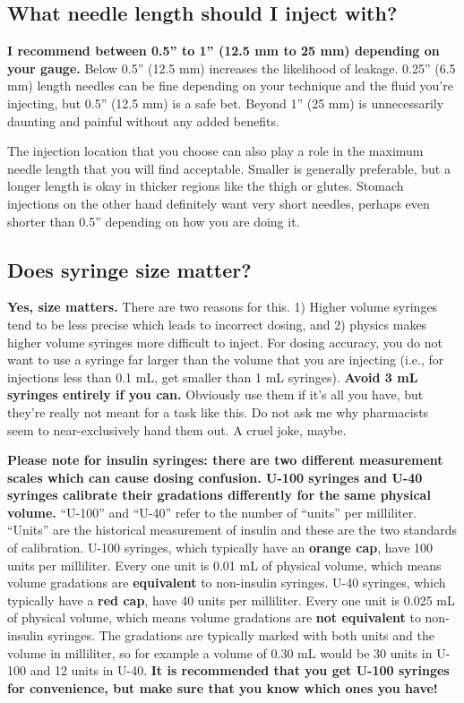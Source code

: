 \documentclass{article}
\begin{document}
\subsection{What needle length should I inject with?}\label{5-17}

\textbf{I recommend between 0.5” to 1” (12.5 mm to 25 mm) depending on your gauge.} Below 0.5” (12.5 mm) increases the likelihood of leakage. 0.25” (6.5 mm) length needles can be fine depending on your technique and the fluid you’re injecting, but 0.5” (12.5 mm) is a safe bet. Beyond 1” (25 mm) is unnecessarily daunting and painful without any added benefits.

The injection location that you choose can also play a role in the maximum needle length that you will find acceptable. Smaller is generally preferable, but a longer length is okay in thicker regions like the thigh or glutes. Stomach injections on the other hand definitely want very short needles, perhaps even shorter than 0.5” depending on how you are doing it. 

\subsection{Does syringe size matter?}\label{5-18}

\textbf{Yes, size matters.} There are two reasons for this. 1) Higher volume syringes tend to be less precise which leads to incorrect dosing, and 2) physics makes higher volume syringes more difficult to inject. For dosing accuracy, you do not want to use a syringe far larger than the volume that you are injecting (i.e., for injections less than 0.1 mL, get smaller than 1 mL syringes). \textbf{Avoid 3 mL syringes entirely if you can.} Obviously use them if it’s all you have, but they’re really not meant for a task like this. Do not ask me why pharmacists seem to near-exclusively hand them out. A cruel joke, maybe.

\textbf{Please note for insulin syringes: there are two different measurement scales which can cause dosing confusion. U-100 syringes and U-40 syringes calibrate their gradations differently for the same physical volume.} “U-100” and “U-40” refer to the number of “units” per milliliter. “Units” are the historical measurement of insulin and these are the two standards of calibration. U-100 syringes, which typically have an \textbf{orange cap}, have 100 units per milliliter. Every one unit is 0.01 mL of physical volume, which means volume gradations are \textbf{equivalent} to non-insulin syringes. U-40 syringes, which typically have a \textbf{red cap}, have 40 units per milliliter. Every one unit is 0.025 mL of physical volume, which means volume gradations are \textbf{not equivalent} to non-insulin syringes. The gradations are typically marked with both units and the volume in milliliter, so for example a volume of 0.30 mL would be 30 units in U-100 and 12 units in U-40. \textbf{It is recommended that you get U-100 syringes for convenience, but make sure that you know which ones you have!}
\end{document}
